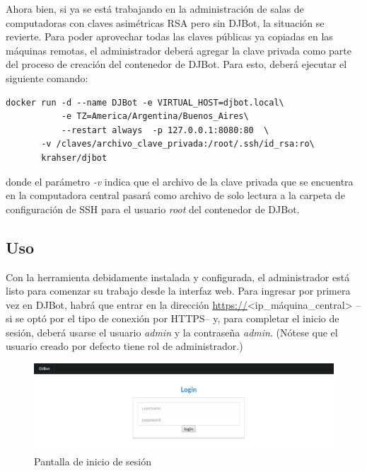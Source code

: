 \documentclass[a4paper,12pt]{article}
\begin{document}
Ahora bien, si ya se está trabajando en la administración de salas de computadoras con claves asimétricas RSA pero sin DJBot, la situación se revierte. Para poder aprovechar todas las claves públicas ya copiadas en las máquinas remotas, el administrador deberá agregar la clave privada como parte del proceso de creación del contenedor de DJBot. Para esto, deberá ejecutar el siguiente comando:\\

\begin{verbatim}
docker run -d --name DJBot -e VIRTUAL_HOST=djbot.local\
           -e TZ=America/Argentina/Buenos_Aires\
           --restart always  -p 127.0.0.1:8080:80  \
	   -v /claves/archivo_clave_privada:/root/.ssh/id_rsa:ro\
	   krahser/djbot
\end{verbatim}

donde el parámetro \emph{-v} indica que el archivo de la clave privada que se encuentra en la computadora central pasará como archivo de solo lectura a la carpeta de configuración de SSH para el usuario \emph{root} del contenedor de DJBot.\\

\subsection{Uso}
\label{sec:orgheadline27}

Con la herramienta debidamente instalada y configurada, el administrador está listo para comenzar su trabajo desde la interfaz web. Para ingresar por primera vez en DJBot, habrá que entrar en la dirección \url{https://}<ip\_máquina\_central> --si se optó por el tipo de conexión por HTTPS-- y, para completar el inicio de sesión, deberá usarse el usuario \emph{admin} y la contraseña \emph{admin}. (Nótese que el usuario creado por defecto tiene rol de administrador.)\\

\begin{figure}[htb]
\centering
\includegraphics[width=.9\linewidth]{./img/login.jpg}
\caption{Pantalla de inicio de sesión}
\end{figure} \\
\end{document}
